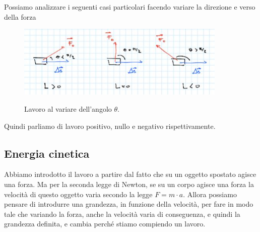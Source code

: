  Possiamo analizzare i seguenti casi particolari facendo variare la direzione e verso della forza 
\begin{figure}[h]
	\begin{center}
		\includegraphics[width=10cm]{lezione7/images/3Precorsolavoroedenergia}\\
		\caption{Lavoro al variare dell'angolo $\theta$.}
	\end{center}
\end{figure}

Quindi parliamo di lavoro positivo, nullo e negativo rispettivamente.

\subsection{Energia cinetica}
Abbiamo introdotto il lavoro a partire dal fatto che su un oggetto spostato agisce una forza. Ma per la seconda legge di Newton, se su un corpo agisce una forza la velocità di questo oggetto varia secondo la legge $F =m\cdot a$. Allora possiamo pensare di introdurre una grandezza, in funzione della velocità, per fare in modo tale che variando la forza, anche la velocità varia di conseguenza, e quindi la grandezza definita, e cambia perché stiamo compiendo un lavoro.


